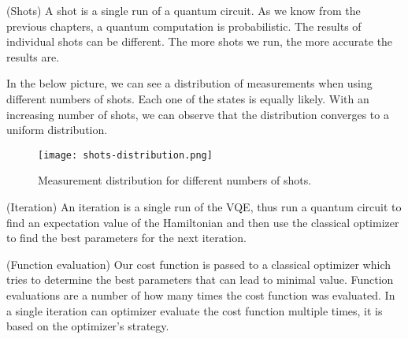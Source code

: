 \begin{definition} (Shots) 
    A shot is a single run of a quantum circuit. As we know from the previous chapters, a quantum computation is probabilistic. The results of individual shots can be different. The more shots we run, the more accurate the results are.
\end{definition}
In the below picture, we can see a distribution of measurements when using different numbers of shots. Each one of the states is equally likely. With an increasing number of shots, we can observe that the distribution converges to a uniform distribution.

\begin{figure}[H]
    \centering
    \texttt{[image: shots-distribution.png]}
    \caption{Measurement distribution for different numbers of shots.}\label{fig:output}
\end{figure}

\begin{definition} (Iteration) 
    An iteration is a single run of the VQE, thus run a quantum circuit to find an expectation value of the Hamiltonian and then use the classical optimizer to find the best parameters for the next iteration.
\end{definition}

\begin{definition}(Function evaluation)
    Our cost function is passed to a classical optimizer which tries to determine the best parameters that can lead to minimal value. Function evaluations are a number of how many times the cost function was evaluated. In a single iteration can optimizer evaluate the cost function multiple times, it is based on the optimizer's strategy.
\end{definition}
